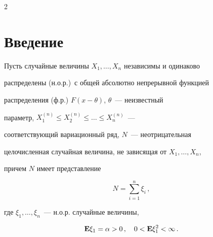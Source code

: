 









      \thispagestyle{headings}





      \begin{multicols}{2}





      \label{st\stat}





\section{Введение}





Пусть случайные величины $X_1,\ldots,X_n$ независимы и одинаково


распределены (н.о.р.)\ с общей абсолютно непрерывной функцией


распределения (ф.р.) $F(x-\theta)$, $\theta$~--- неизвестный


параметр, $X_1^{(n)}\leq X_2^{(n)}\leq \ldots\leq X_n^{(n)}$~---


соответствующий вариационный ряд, $N$~--- неотрицательная


целочисленная случайная величина, не зависящая от $X_1,\ldots,X_n$,


причем $N$ имеет представление


\begin{equation}


N=\sum_{i=1}^{n}\xi_i\,,


\label{1}


\end{equation}


где $\xi_1,\ldots,\xi_n$~--- н.о.р. случайные величины,


\begin{equation}


{\bf E}\xi_1=\alpha>0\,, \quad 0<{\bf E}\xi_1^2<\infty\,.


\label{2}



\end{equation}
\end{multicols}
